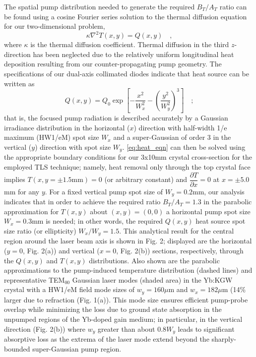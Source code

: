 The spatial pump distribution needed to generate the required $B_T/A_T$ ratio can be found using a cosine Fourier series solution to the thermal diffusion equation for our two-dimensional problem,
\begin{equation} \label{eq:heat_eqn}
  \kappa \nabla^2 T(x,y) = Q(x,y)
  \quad\text{,}
\end{equation}
where $\kappa$ is the thermal diffusion coefficient.
Thermal diffusion in the third $z$-direction has been neglected due to the relatively uniform longitudinal heat deposition resulting from our counter-propagating pump geometry\cite{Rimington_thermal_lens_2004}.
The specifications of our dual-axis collimated diodes\cite{website_limo} indicate that heat source can be written as
\begin{equation}
  Q(x,y) = Q_0 \exp \left[ - \frac{x^2}{W_x^2} - \left( \frac{y^2}{W_y^2} \right)^3 \right]
  \quad\text{;}
\end{equation}
that is, the focused pump radiation is described accurately by a Gaussian irradiance distribution in the horizontal ($x$) direction with half-width 1/e maximum (HW1/eM) spot size $W_x$ and a super-Gaussian of order 3 in the vertical ($y$) direction with spot size $W_y$.
\ref{eq:heat_eqn} can then be solved using the appropriate boundary conditions for our 3x10mm crystal cross-section for the employed TLS technique\cite{Rimington_thermal_lens_2004}; namely, heat removal only through the top crystal face implies $T(x,y = \pm 1.5\text{mm}) = 0$ (or arbitrary constant) and $\dfrac{\partial T}{\partial x} = 0$ at $ x = \pm 5.0$mm for any $y$.
For a fixed vertical pump spot size of $W_y = 0.2$mm, our analysis indicates that in order to achieve the required ratio $B_T / A_T = 1.3$ in the parabolic approximation for $T(x,y)$ about $(x,y) = (0,0)$ a horizontal pump spot size $W_x = 0.3$mm is needed; in other words, the required $Q(x,y)$ heat source spot size ratio (or ellipticity) $W_x / W_y = 1.5$.
This analytical result for the central region around the laser beam axis is shown in Fig. 2; displayed are the
horizontal ($y = 0$, Fig. 2(a)) and vertical ($x = 0$, Fig. 2(b)) sections, respectively, through the $Q(x,y)$ and $T(x,y)$ distributions.
Also shown are the parabolic approximations to the pump-induced temperature distribution (dashed lines) and representative TEM$_{00}$ Gaussian laser modes (shaded area) in the Yb:KGW crystal with a HW1/eM field mode sizes of $w_y = 160\mu$m and $w_x = 182 \mu$m (14\% larger due to refraction (Fig. 1(a)).
This mode size ensures efficient pump-probe overlap while minimizing the loss due to ground state absorption in the unpumped regions of the Yb-doped gain medium\cite{Brenier_new_criteria}; in particular, in the vertical direction (Fig. 2(b)) where $w_y$ greater than about $0.8 W_y$ leads to significant absorptive loss as the extrema of the laser mode extend beyond the sharply-bounded super-Gaussian pump region.

